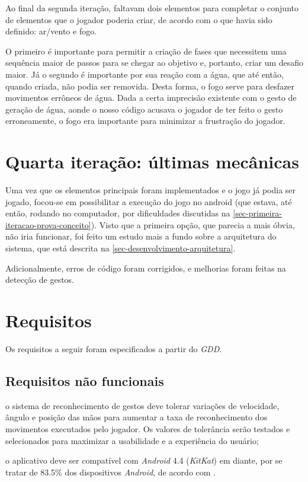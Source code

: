 Ao final da segunda iteração, faltavam dois elementos para
completar o conjunto de elementos que o jogador poderia criar, de acordo
com o que havia sido definido: ar/vento e fogo.

O primeiro é importante para permitir a criação de fases que necessitem uma 
sequência maior de passos para se chegar ao objetivo e, portanto, criar
um desafio maior. Já o segundo é importante por sua reação com a água, 
que até então, quando criada, não podia ser removida. Desta forma, o 
fogo serve para desfazer movimentos errôneos de água. Dada a certa 
imprecisão existente com o gesto de geração de água, aonde o nosso
código acusava o jogador de ter feito o gesto erroneamente, o fogo era
importante para minimizar a frustração do jogador.

\section{Quarta iteração: últimas mecânicas}\label{sec-quarta-iteracao-integracao}

Uma vez que os elementos principais foram implementados e o jogo já podia
ser jogado, focou-se em possibilitar a execução do jogo no android 
(que estava, até então, rodando no computador, por dificuldades 
discutidas na \autoref{sec-primeira-iteracao-prova-conceito}). Visto que
a primeira opção, que parecia a mais óbvia, não iria funcionar, foi feito um 
estudo mais a fundo sobre a arquitetura do sistema, que está descrita
na \autoref{sec-desenvolvimento-arquitetura}. 

Adicionalmente, erros de código foram corrigidos, e melhorias foram
feitas na detecção de gestos.

\section{Requisitos}\label{sec-requisitos}

Os requisitos a seguir foram especificados a partir do \textit{GDD}.

\subsection{Requisitos não funcionais}\label{subsec-requisitos-nao-funcionais}

\begin{alineas}
	\item o sistema de reconhecimento de gestos deve tolerar variações 
	 de velocidade, ângulo e posição das mãos para aumentar a taxa 
 	 de reconhecimento dos movimentos executados pelo jogador. Os 
	 valores de tolerância serão testados e selecionados para maximizar 
	 a usabilidade e a experiência do usuário;
	\item o aplicativo deve ser compatível com \textit{Android} 4.4
	 (\textit{KitKat}) em diante, por se tratar de 83.5\% dos 
	 dispositivos \textit{Android}, de acordo com 
	 \cite{google:2016:androidVersion}.
	
\end{alineas}


